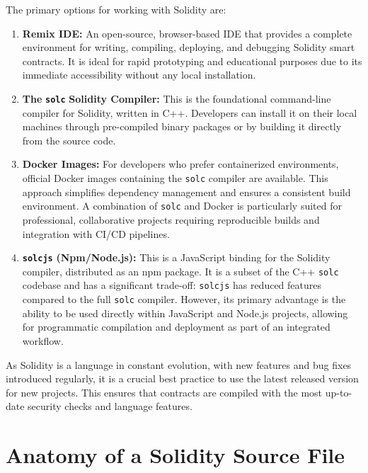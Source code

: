 \documentclass{scrbook}
\begin{document}
The primary options for working with Solidity are:

\begin{enumerate}
    \item \textbf{Remix IDE:} An open-source, browser-based IDE that provides a complete environment for writing, compiling, deploying, and debugging Solidity smart contracts. It is ideal for rapid prototyping and educational purposes due to its immediate accessibility without any local installation.
    
    \item \textbf{The} \texttt{\textbf{solc}} \textbf{Solidity Compiler:} This is the foundational command-line compiler for Solidity, written in C++. Developers can install it on their local machines through pre-compiled binary packages or by building it directly from the source code.
    
    \item \textbf{Docker Images:} For developers who prefer containerized environments, official Docker images containing the \texttt{solc} compiler are available. This approach simplifies dependency management and ensures a consistent build environment. A combination of \texttt{solc} and Docker is particularly suited for professional, collaborative projects requiring reproducible builds and integration with CI/CD pipelines.
    
    \item \texttt{\textbf{solcjs}} \textbf{(Npm/Node.js):} This is a JavaScript binding for the Solidity compiler, distributed as an npm package. It is a subset of the C++ \texttt{solc} codebase and has a significant trade-off: \texttt{solcjs} has reduced features compared to the full \texttt{solc} compiler. However, its primary advantage is the ability to be used directly within JavaScript and Node.js projects, allowing for programmatic compilation and deployment as part of an integrated workflow.
\end{enumerate}

As Solidity is a language in constant evolution, with new features and bug fixes introduced regularly, it is a crucial best practice to use the latest released version for new projects. This ensures that contracts are compiled with the most up-to-date security checks and language features.

\chapter{Anatomy of a Solidity Source File}
\end{document}
